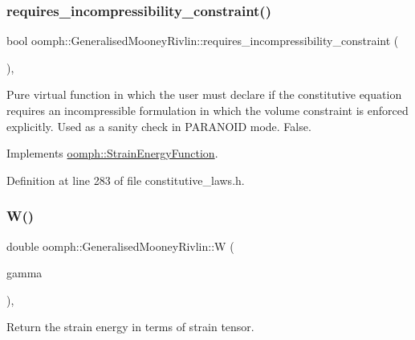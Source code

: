 \subsubsection{\texorpdfstring{requires\+\_\+incompressibility\+\_\+constraint()}{requires\_incompressibility\_constraint()}}
{\footnotesize\ttfamily bool oomph\+::\+Generalised\+Mooney\+Rivlin\+::requires\+\_\+incompressibility\+\_\+constraint (\begin{DoxyParamCaption}{ }\end{DoxyParamCaption})\hspace{0.3cm}{\ttfamily [inline]}, {\ttfamily [virtual]}}



Pure virtual function in which the user must declare if the constitutive equation requires an incompressible formulation in which the volume constraint is enforced explicitly. Used as a sanity check in P\+A\+R\+A\+N\+O\+ID mode. False. 



Implements \hyperlink{classoomph_1_1StrainEnergyFunction_a312fe03c070f5c45a99ae4e186936147}{oomph\+::\+Strain\+Energy\+Function}.



Definition at line 283 of file constitutive\+\_\+laws.\+h.

\mbox{\label{classoomph_1_1GeneralisedMooneyRivlin_a91ff4fa7c19304c98f9a0017c22747a9}} 
\subsubsection{\texorpdfstring{W()}{W()}\hspace{0.1cm}{\footnotesize\ttfamily [1/2]}}
{\footnotesize\ttfamily double oomph\+::\+Generalised\+Mooney\+Rivlin\+::W (\begin{DoxyParamCaption}\item[{const \hyperlink{classoomph_1_1DenseMatrix}{Dense\+Matrix}$<$ double $>$ \&}]{gamma }\end{DoxyParamCaption})\hspace{0.3cm}{\ttfamily [inline]}, {\ttfamily [virtual]}}



Return the strain energy in terms of strain tensor. 



